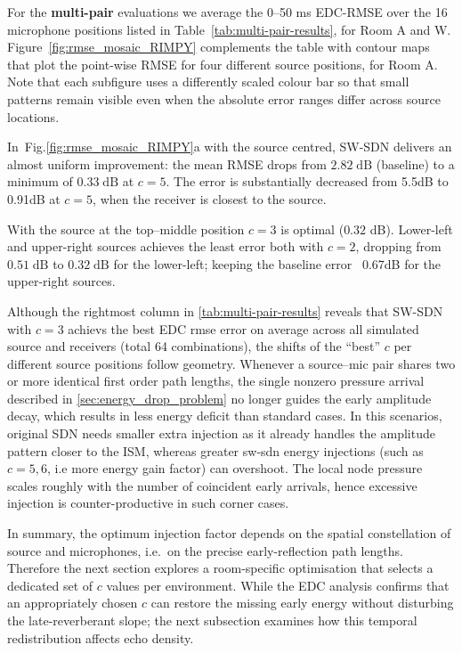 \documentclass[journal]{IEEEtran}
\begin{document}
For the \textbf{multi-pair} evaluations we average the 0–50 ms EDC-RMSE over the 16 microphone positions listed in Table~\ref{tab:multi-pair-results}, for Room A and W.  
Figure~\ref{fig:rmse_mosaic_RIMPY} complements the table with contour maps that plot the point-wise RMSE for four different source positions, for Room A.
Note that each subfigure uses a differently scaled colour bar so that small patterns remain visible even when the absolute error ranges differ across source locations.

In~Fig.\ref{fig:rmse_mosaic_RIMPY}a with the source centred, SW-SDN delivers an almost uniform improvement:
the mean RMSE drops from \(2.82\;\text{dB}\) (baseline) to a minimum of \(0.33\;\text{dB}\) at \(c=5\). 
The error is substantially decreased from 5.5dB to 0.91dB at \(c=5\),  when the receiver is closest to the source.  

With the source at the top–middle position \(c=3\) is optimal (\(0.32\) dB). 
Lower-left and upper-right sources achieves the least error both with $c=2$, 
dropping from \(0.51\;\text{dB}\) to \(0.32\;\text{dB}\) for the lower-left; keeping the baseline error ~0.67dB for the upper-right sources.

Although the rightmost column in \ref{tab:multi-pair-results} reveals that SW-SDN with $c=3$ achievs the best
EDC rmse error on average across all simulated source and receivers (total 64 combinations), 
the shifts of the “best” \(c\) per different source positions follow geometry. 
Whenever a source–mic pair shares two or more identical first order path lengths, 
the single nonzero pressure arrival described in \ref{sec:energy_drop_problem} no longer guides the early amplitude decay, 
which results in less energy deficit than standard cases. 
In this scenarios, original SDN needs smaller extra injection as it already handles the amplitude pattern closer to the ISM, 
whereas greater sw-sdn energy injections (such as $c=5,6$, i.e more energy gain factor) can overshoot. 
The local node pressure scales roughly with the number of coincident early arrivals, hence excessive injection is counter-productive in such corner cases.

In summary, the optimum injection factor depends on the spatial
constellation of source and microphones, i.e.\ on the precise
early-reflection path lengths. Therefore the next section explores a room-specific optimisation that selects a dedicated set of \(c\) values per environment. 
While the EDC analysis confirms that an appropriately chosen $c$ can restore the missing early energy without disturbing the late-reverberant slope; 
the next subsection examines how this temporal redistribution affects echo density. 
\end{document}
